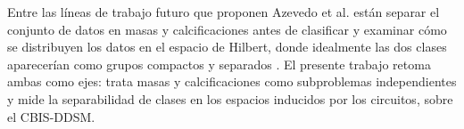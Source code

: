 Entre las líneas de trabajo futuro que proponen Azevedo et al. están separar el conjunto de datos en masas y calcificaciones antes de clasificar y examinar cómo se distribuyen los datos en el espacio de Hilbert, donde idealmente las dos clases aparecerían como grupos compactos y separados \cite{Azevedo2022QuantumTransfer}. El presente trabajo retoma ambas como ejes: trata masas y calcificaciones como subproblemas independientes y mide la separabilidad de clases en los espacios inducidos por los circuitos, sobre el CBIS-DDSM.
